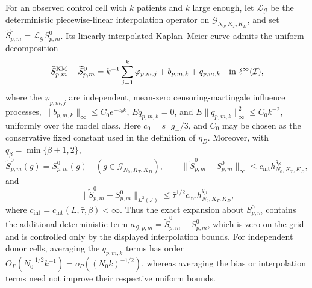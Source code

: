 For an observed control cell with \(k\) patients and \(k\) large enough, let \(\mathcal L_{\mathcal G}\) be the deterministic piecewise-linear interpolation operator on \(\mathcal G_{N_0,K_T,K_D}\), and set \(\widetilde S^0_{p,m}=\mathcal L_{\mathcal G}S^0_{p,m}\).  Its linearly interpolated Kaplan--Meier curve admits the uniform decomposition
\[
 \widehat S^{\mathrm{KM}}_{p,m}-\widetilde S^0_{p,m}
 =k^{-1}\sum_{j=1}^{k}\varphi_{p,m,j}+b_{p,m,k}+q_{p,m,k}
 \quad\hbox{in }\ell^\infty(\mathcal I),
\]
where the \(\varphi_{p,m,j}\) are independent, mean-zero censoring-martingale influence processes, \(\|b_{p,m,k}\|_\infty\le C_0e^{-c_0k}\), \(E q_{p,m,k}=0\), and \(E\|q_{p,m,k}\|_\infty^2\le C_0k^{-2}\), uniformly over the model class.  Here \(c_0=s_-g_-/3\), and \(C_0\) may be chosen as the conservative fixed constant used in the definition of \(\eta_D\).  Moreover, with \(q_\beta=\min\{\beta+1,2\}\),
\[
 \widetilde S^0_{p,m}(g)=S^0_{p,m}(g)\quad(g\in\mathcal G_{N_0,K_T,K_D}),
 \qquad
 \|\widetilde S^0_{p,m}-S^0_{p,m}\|_\infty
 \le c_{\mathrm{int}}h_{N_0,K_T,K_D}^{q_\beta},
\]
and
\[
 \|\widetilde S^0_{p,m}-S^0_{p,m}\|_{L^2(\mathcal I)}
 \le \bar\tau^{1/2}c_{\mathrm{int}}h_{N_0,K_T,K_D}^{q_\beta},
\]
where \(c_{\mathrm{int}}=c_{\mathrm{int}}(L,\bar\tau,\beta)<\infty\).  Thus the exact expansion about \(S^0_{p,m}\) contains the additional deterministic term \(a_{\mathcal G,p,m}=\widetilde S^0_{p,m}-S^0_{p,m}\), which is zero on the grid and is controlled only by the displayed interpolation bounds.  For independent donor cells, averaging the \(q_{p,m,k}\) terms has order \(O_P(N_0^{-1/2}k^{-1})=o_P((N_0k)^{-1/2})\), whereas averaging the bias or interpolation terms need not improve their respective uniform bounds.